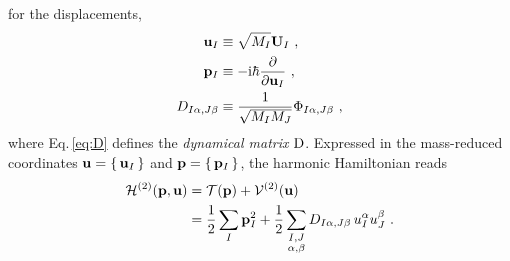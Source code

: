  for the displacements,
\begin{align}
	{\bf u}_I 
		&\equiv \sqrt{M_I} {\bf U}_I~, 
		\label{eq:uI} \\
	{\bf p}_I 
		&\equiv -\im \hbar \frac{\partial}{\partial {\bf u}_I}~,
		\label{eq:pI} \\
	D_{I \alpha, J \beta}
		&\equiv \frac{1}{\sqrt{M_I M_J}} 
		\Phi_{I \alpha, J \beta}~,
		\label{eq:D}
\end{align}
where Eq.\,\eqref{eq:D} defines the \emph{dynamical matrix} $\rm D$.
Expressed in the mass-reduced coordinates ${\bf u} = \set{{\bf u}_I}$ and ${\bf p} = \set{{\bf p}_I}$, the harmonic Hamiltonian reads
\begin{align}
	\begin{split}
		\mathcal{H}^{(2)}({\bf p}, {\bf u})
			&= \mathcal T ({\bf p}) + \mathcal{V}^{(2)} ({\bf u})\\
			&= \halb \sum_I {\bf p}_I^2 + 
				\halb \sum_{\substack{I, J \\ \alpha, \beta}}
					D_{I \alpha, J \beta}
					\, u_I^\alpha u_J^\beta~.
	\end{split}
	\label{eq:ha.H1}
\end{align}

